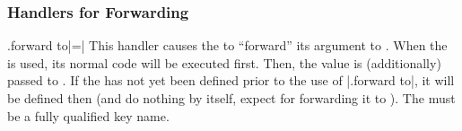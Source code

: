 \subsubsection{Handlers for Forwarding}

\begin{handler}{{.forward to}|=|}
  This handler causes the  to ``forward'' its argument to
  . When the  is used, its normal code
  will be executed first. Then, the value is (additionally) passed to
  . If the  has not yet been defined prior
  to the use of |.forward to|, it will be defined then (and do nothing by
  itself, expect for forwarding it to ). The
   must be a fully qualified key name. 
\begin{codeexample}[]
 
\end{codeexample}
\end{handler}


